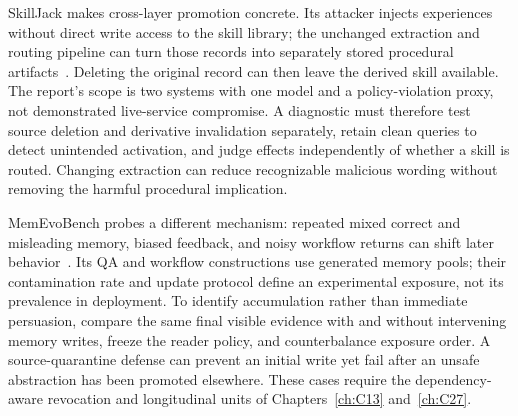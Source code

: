 SkillJack makes cross-layer promotion concrete. Its attacker injects experiences without direct write access to the skill library; the unchanged extraction and routing pipeline can turn those records into separately stored procedural artifacts~\cite{ying2026skilljack}. Deleting the original record can then leave the derived skill available. The report's scope is two systems with one model and a policy-violation proxy, not demonstrated live-service compromise. A diagnostic must therefore test source deletion and derivative invalidation separately, retain clean queries to detect unintended activation, and judge effects independently of whether a skill is routed. Changing extraction can reduce recognizable malicious wording without removing the harmful procedural implication.

MemEvoBench probes a different mechanism: repeated mixed correct and misleading memory, biased feedback, and noisy workflow returns can shift later behavior~\cite{xie2026memevo}. Its QA and workflow constructions use generated memory pools; their contamination rate and update protocol define an experimental exposure, not its prevalence in deployment. To identify accumulation rather than immediate persuasion, compare the same final visible evidence with and without intervening memory writes, freeze the reader policy, and counterbalance exposure order. A source-quarantine defense can prevent an initial write yet fail after an unsafe abstraction has been promoted elsewhere. These cases require the dependency-aware revocation and longitudinal units of Chapters~\ref{ch:C13} and~\ref{ch:C27}.

